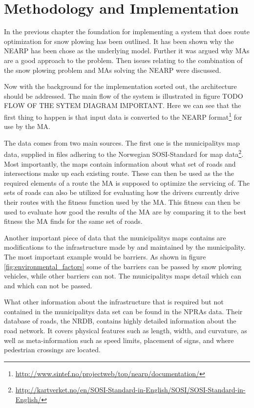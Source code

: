 \chapter{Methodology and Implementation}

In the previous chapter the foundation for implementing a system that does route optimization for snow plowing has been outlined. It has been shown why the NEARP has been chose as the underlying model. Further it was argued why MAs are a good approach to the problem. Then issues relating to the combination of the snow plowing problem and MAs solving the NEARP were discussed.

Now with the background for the implementation sorted out, the architecture should be addressed. The main flow of the system is illustrated in figure TODO FLOW OF THE SYTEM DIAGRAM IMPORTANT. Here we can see that the first thing to happen is that input data is converted to the NEARP format\footnote{\url{http://www.sintef.no/projectweb/top/nearp/documentation/}} for use by the MA.


The data comes from two main sources. The first one is the municipalitys map data, supplied in files adhering to the Norwegian SOSI-Standard for map data\footnote{\url{http://kartverket.no/en/SOSI-Standard-in-English/SOSI/SOSI-Standard-in-English/}}. Most importantly, the maps contain information about what set of roads and intersections make up each existing route. These can then be used as the the required elements of a route the MA is supposed to optimize the servicing of. The sets of roads can also be utilized for evaluating how the drivers currently drive their routes with the fitness function used by the MA. This fitness can then be used to evaluate how good the results of the MA are by comparing it to the best fitness the MA finds for the same set of roads.

Another important piece of data that the municipalitys maps contains are modifications to the infrastructure made by and maintained by the municipality. The most important example would be barriers. As shown in figure \ref{fig:environmental_factors} some of the barriers can be passed by snow plowing vehicles, while other barriers can not. The municipalitys maps detail which can and which can not be passed.

What other information about the infrastructure that is required but not contained in the municipalitys data set can be found in the NPRAs data. Their database of roads, the NRDB, contains highly detailed information about the road network. It covers physical features such as length, width, and curvature, as well as meta-information such as speed limits, placement of signs, and where pedestrian crossings are located.








